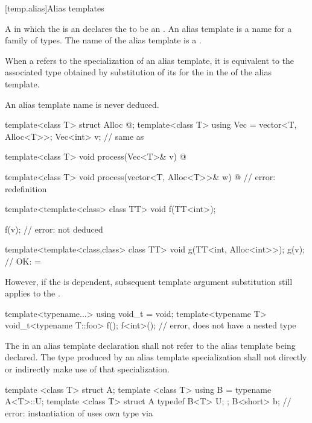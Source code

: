 [temp.alias]{Alias templates}

\pnum
A  in which the  is an
 declares the
 to be an .
An alias template is a name for a family of
types. The name of the alias template is a .

\pnum
When a  refers to the specialization of
an alias template, it is equivalent to the associated type obtained by
substitution of its  for the
 in the  of
the alias template.
\begin{note} An alias template name is never deduced.\end{note}
\begin{example}

\begin{codeblock}
template<class T> struct Alloc { @\commentellip@ };
template<class T> using Vec = vector<T, Alloc<T>>;
Vec<int> v;         // same as 

template<class T>
  void process(Vec<T>& v)
  { @\commentellip@ }

template<class T>
  void process(vector<T, Alloc<T>>& w)
  { @\commentellip@ }     // error: redefinition

template<template<class> class TT>
  void f(TT<int>);

f(v);               // error:  not deduced

template<template<class,class> class TT>
  void g(TT<int, Alloc<int>>);
g(v);               // OK:  = 
\end{codeblock}

\end{example}

\pnum
However, if the  is dependent, subsequent template
argument substitution still applies to the .
\begin{example}
\begin{codeblock}
template<typename...> using void_t = void;
template<typename T> void_t<typename T::foo> f();
f<int>();           // error,  does not have a nested type 
\end{codeblock}
\end{example}

\pnum
The  in an alias template declaration shall not refer to
the alias template being declared. The type produced by an alias template
specialization shall not directly or indirectly make use of that specialization.
\begin{example}

\begin{codeblock}
template <class T> struct A;
template <class T> using B = typename A<T>::U;
template <class T> struct A {
  typedef B<T> U;
};
B<short> b;         // error: instantiation of  uses own type via 
\end{codeblock}
\end{example}

